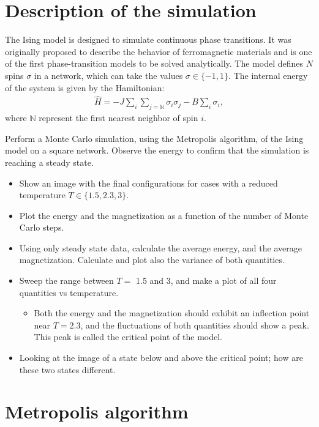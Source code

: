 \documentclass[main.tex]{subfiles}
\begin{document}
\section{Description of the simulation}

The Ising model is designed to simulate continuous phase transitions. 
It was originally proposed to describe the behavior of ferromagnetic materials and is one of the first phase-transition models to be solved analytically. 
The model defines $N$ spins $\sigma$ in a network, which can take the values $\sigma\in\{-1,1\}$. 
The internal energy of the system is given by the Hamiltonian: 
\begin{gather}
    \hat{H} = -J\sum_i\sum_{j=\mathbb{N}}\sigma_i\sigma_j-B\sum_i\sigma_i,
\end{gather}
where $\mathbb{N}$ represent the first nearest neighbor of spin $i$.

Perform a Monte Carlo simulation, using the Metropolis algorithm, of the Ising model on a square network. 
Observe the energy to confirm that the simulation is reaching a steady state.

\begin{itemize}
    \item Show an image with the final configurations for cases with a reduced temperature $T\in\{1.5,2.3,3\}$.
    \item Plot the energy and the magnetization as a function of the number of Monte Carlo steps.
    \item Using only steady state data, calculate the average energy, and the average magnetization. 
        Calculate and plot also the variance of both quantities. 
    \item Sweep the range between $T =$ \num{1.5} and \num{3}, and make a plot of all four quantities vs temperature.
    \begin{itemize}
        \item Both the energy and the magnetization should exhibit an inflection point near $T=2.3$, and the fluctuations of both quantities should show a peak. 
            This peak is called the critical point of the model. 
    \end{itemize}
    \item Looking at the image of a state below and above the critical point; how are these two states different.
\end{itemize}

\section{Metropolis algorithm}
\end{document}

